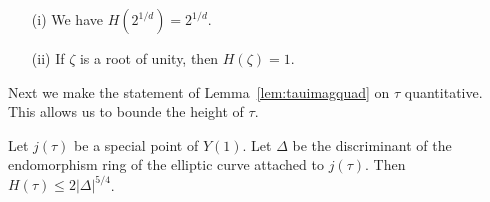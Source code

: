\begin{example}
  \begin{enumerate}
  \item [(i)] We have $H(2^{1/d})=2^{1/d}$.

  \item[(ii)] If $\zeta$ is a root of unity, then $H(\zeta)=1$.
  \end{enumerate}
\end{example}

Next we make the statement of Lemma~\ref{lem:tauimagquad} on $\tau$
quantitative.
This allows us to bounde the height of $\tau$. 

\begin{lemma}
  \label{lem:heighttaubound}
  Let $j(\tau)$ be a special point of $Y(1)$.
  Let $\Delta$ be the discriminant of
  the endomorphism ring of the elliptic curve attached to $j(\tau)$.
  Then $H(\tau)\le 2 |\Delta|^{5/4}$. 
\end{lemma}
